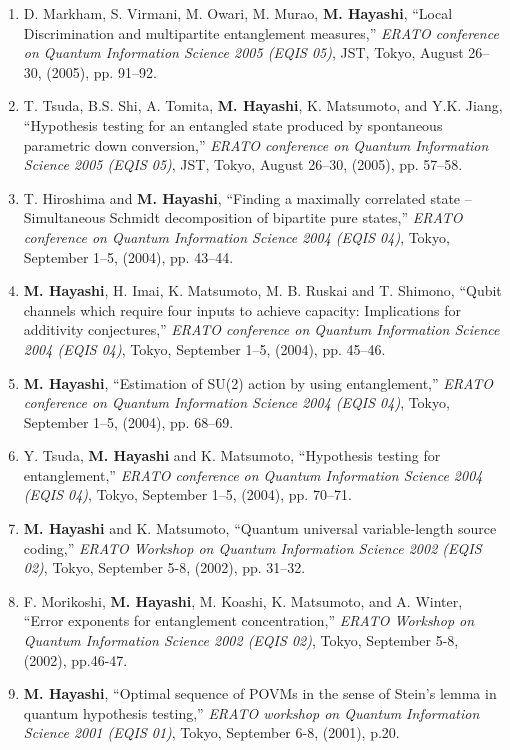 \documentclass[a4paper,12pt,oneside]{article}
\begin{document}
\begin{enumerate}
\item
D. Markham, S. Virmani, M. Owari, M. Murao, \textbf{M. Hayashi}, ``Local Discrimination and multipartite entanglement measures,'' 
{\em ERATO conference on Quantum Information Science 2005 (EQIS 05)}, 
JST, Tokyo, August 26--30, (2005), pp. 91--92.

\item
T. Tsuda, B.S. Shi, A. Tomita, \textbf{M. Hayashi}, K. Matsumoto, and Y.K. Jiang, ``Hypothesis testing for an entangled state produced by spontaneous parametric down conversion,'' 
{\em ERATO conference on Quantum Information Science 2005 (EQIS 05)}, 
JST, Tokyo, August 26--30, (2005), pp. 57--58.


\item
T. Hiroshima and \textbf{M. Hayashi}, ``Finding a maximally correlated state -- Simultaneous Schmidt decomposition of bipartite pure states,'' 
{\em ERATO conference on Quantum Information Science 2004 (EQIS 04)}, 
Tokyo, September 1--5, (2004), pp. 43--44.

\item
\textbf{M. Hayashi}, H. Imai, K. Matsumoto, M. B. Ruskai and T. Shimono, ``Qubit channels which require four inputs to achieve capacity: Implications for additivity conjectures,'' 
{\em ERATO conference on Quantum Information Science 2004 (EQIS 04)}, 
Tokyo, September 1--5, (2004), 
pp. 45--46.

\item
\textbf{M. Hayashi}, ``Estimation of SU(2) action by using entanglement,'' 
{\em ERATO conference on Quantum Information Science 2004 (EQIS 04)}, 
Tokyo, September 1--5, (2004), 
pp. 68--69.

\item
Y. Tsuda, \textbf{M. Hayashi} and K. Matsumoto, ``Hypothesis testing for entanglement,'' 
{\em ERATO conference on Quantum Information Science 2004 (EQIS 04)}, 
Tokyo, September 1--5, (2004), 
pp. 70--71.

\item
\textbf{M. Hayashi} and K. Matsumoto, ``Quantum universal variable-length source coding,'' 
{\em ERATO Workshop on Quantum Information Science 2002 (EQIS 02)}, 
Tokyo, September 5-8, (2002), 
pp. 31--32.

\item
F. Morikoshi, \textbf{M. Hayashi}, M. Koashi, K. Matsumoto, and A. Winter, ``Error exponents for entanglement concentration,'' 
{\em ERATO Workshop on Quantum Information Science 2002 (EQIS 02)}, 
Tokyo, September 5-8, (2002), 
pp.46-47.

\item
\textbf{M. Hayashi}, ``Optimal sequence of POVMs in the sense of Stein's lemma in quantum hypothesis testing,'' 
{\em ERATO workshop on Quantum Information Science 2001 (EQIS 01)}, 
Tokyo, September 6-8, (2001), p.20.

\end{enumerate}
\end{document}
